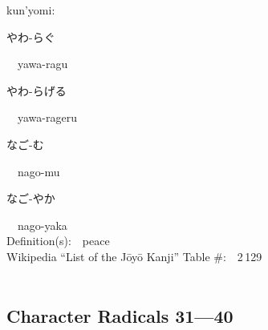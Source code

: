 \begin{multicols}{2}
{\hspace*{1em}}kun'yomi:\ \ \\
{\hspace*{2em}}{\begin{CJK}{UTF8}{min} やわ-らぐ \end{CJK}}\ \ yawa-ragu\ \ \\
{\hspace*{2em}}{\begin{CJK}{UTF8}{min} やわ-らげる \end{CJK}}\ \ yawa-rageru\ \ \\
{\hspace*{2em}}{\begin{CJK}{UTF8}{min} なご-む \end{CJK}}\ \ nago-mu\ \ \\
{\hspace*{2em}}{\begin{CJK}{UTF8}{min} なご-やか \end{CJK}}\ \ nago-yaka\ \ \\
Definition(s):\ \ peace \\
Wikipedia ``List of the J\=oy\=o Kanji'' Table \#:\ \ 2\,129 \\
\ \ \\
\end{multicols}



\newpage



\subsection*{Character Radicals 31---40 }
  \label{P3-S05}

